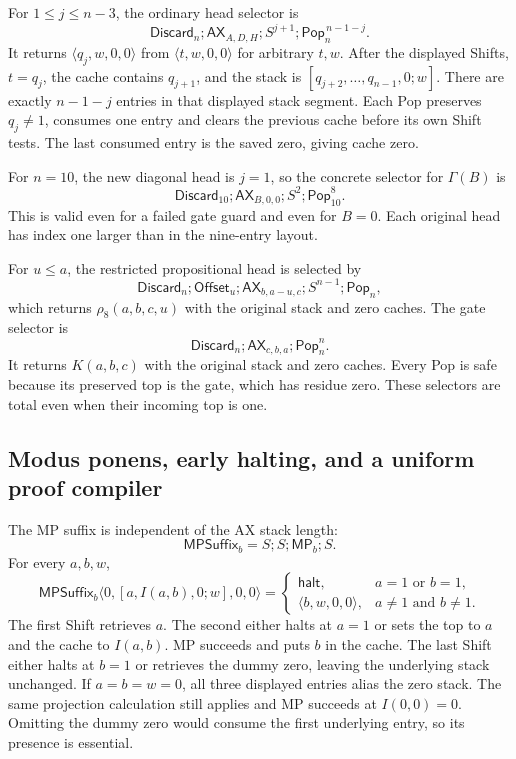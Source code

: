 For $1\le j\le n-3$, the ordinary head selector is
\[
 \mathsf{Discard}_n;\mathsf{AX}_{A,D,H};S^{j+1};
                  \mathsf{Pop}_n^{\,n-1-j}.
\]
It returns $\langle q_j,w,0,0\rangle$ from
$\langle t,w,0,0\rangle$ for arbitrary $t,w$. After the displayed
Shifts, $t=q_j$, the cache contains $q_{j+1}$, and the stack is
$[q_{j+2},\ldots,q_{n-1},0;w]$. There are exactly $n-1-j$ entries
in that displayed stack segment. Each Pop preserves $q_j\ne1$, consumes
one entry and clears the previous cache before its own Shift tests.
The last consumed entry is the saved zero, giving cache zero.

For $n=10$, the new diagonal head is $j=1$, so the concrete selector
for $\Gamma(B)$ is
\[
 \mathsf{Discard}_{10};\mathsf{AX}_{B,0,0};S^2;
                           \mathsf{Pop}_{10}^{8}.
\]
This is valid even for a failed gate guard and even for $B=0$.
Each original head has index one larger than in the nine-entry layout.

For $u\le a$, the restricted propositional head is selected by
\[
 \mathsf{Discard}_n;\mathsf{Offset}_u;
 \mathsf{AX}_{b,a-u,c};S^{n-1};\mathsf{Pop}_n,
\]
which returns $\rho_8(a,b,c,u)$ with the original stack and zero caches.
The gate selector is
\[
 \mathsf{Discard}_n;\mathsf{AX}_{c,b,a};\mathsf{Pop}_n^{n}.
\]
It returns $K(a,b,c)$ with the original stack and zero caches. Every Pop
is safe because its preserved top is the gate, which has residue zero.
These selectors are total even when their incoming top is one.

\subsection{Modus ponens, early halting, and a uniform proof compiler}

The MP suffix is independent of the AX stack length:
\[
 \mathsf{MPSuffix}_b=S;S;\mathsf{MP}_b;S.
\]
For every $a,b,w$,
\[
 \mathsf{MPSuffix}_b
  \langle0,[a,I(a,b),0;w],0,0\rangle
 =\begin{cases}
   \mathsf{halt},&a=1\text{ or }b=1,\\
   \langle b,w,0,0\rangle,&a\ne1\text{ and }b\ne1.
  \end{cases}
\]
The first Shift retrieves $a$. The second either halts at $a=1$ or
sets the top to $a$ and the cache to $I(a,b)$. MP succeeds and puts $b$
in the cache. The last Shift either halts at $b=1$ or retrieves the dummy
zero, leaving the underlying stack unchanged. If $a=b=w=0$, all three
displayed entries alias the zero stack. The same projection calculation
still applies and MP succeeds at $I(0,0)=0$. Omitting the dummy zero would
consume the first underlying entry, so its presence is essential.

